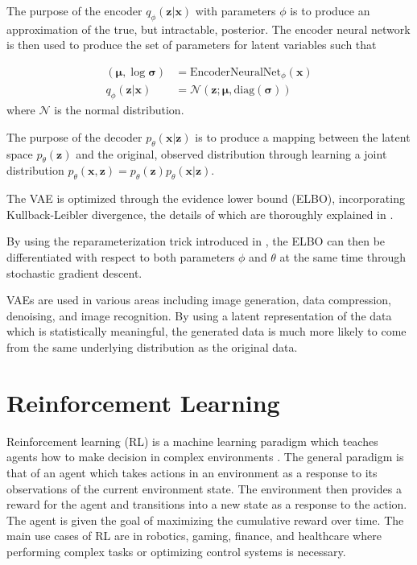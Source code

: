 The purpose of the encoder $q_\phi(\boldsymbol{z}|\boldsymbol{x})$ with parameters $\phi$ is to produce an approximation of the true, but intractable, posterior.
The encoder neural network is then used to produce the set of parameters for latent variables such that

\begin{align}
	(\boldsymbol{\mu}, \log \boldsymbol{\sigma}) &= \text{EncoderNeuralNet}_\phi (\boldsymbol{x})\\
	q_\phi(\boldsymbol{z}|\boldsymbol{x}) &= \mathcal{N}(\boldsymbol{z}; \boldsymbol{\mu}, \text{diag}(\boldsymbol{\sigma}))
\end{align}
where $\mathcal{N}$ is the normal distribution.

The purpose of the decoder $p_\theta (\boldsymbol{x}|\boldsymbol{z})$ is to produce a mapping between the latent space $p_\theta (\boldsymbol{z})$ and the original, observed distribution through learning a joint distribution $p_\theta (\boldsymbol{x}, \boldsymbol{z}) = p_\theta (\boldsymbol{z})p_\theta (\boldsymbol{x}|\boldsymbol{z})$.

The VAE is optimized through the evidence lower bound (ELBO), incorporating Kullback-Leibler divergence, the details of which are thoroughly explained in \cite{kingma2019introduction}.

By using the reparameterization trick introduced in \cite{kingma2013auto}, the ELBO can then be differentiated with respect to both parameters $\phi$ and $\theta$ at the same time through stochastic gradient descent.

VAEs are used in various areas including image generation, data compression, denoising, and image recognition.
By using a latent representation of the data which is statistically meaningful, the generated data is much more likely to come from the same underlying distribution as the original data.

\section{Reinforcement Learning}

Reinforcement learning (RL) is a machine learning paradigm which teaches agents how to make decision in complex environments \cite{tavakol2022dic}.
The general paradigm is that of an agent which takes actions in an environment as a response to its observations of the current environment state.
The environment then provides a reward for the agent and transitions into a new state as a response to the action.
The agent is given the goal of maximizing the cumulative reward over time.
The main use cases of RL are in robotics, gaming, finance, and healthcare where performing complex tasks or optimizing control systems is necessary.


